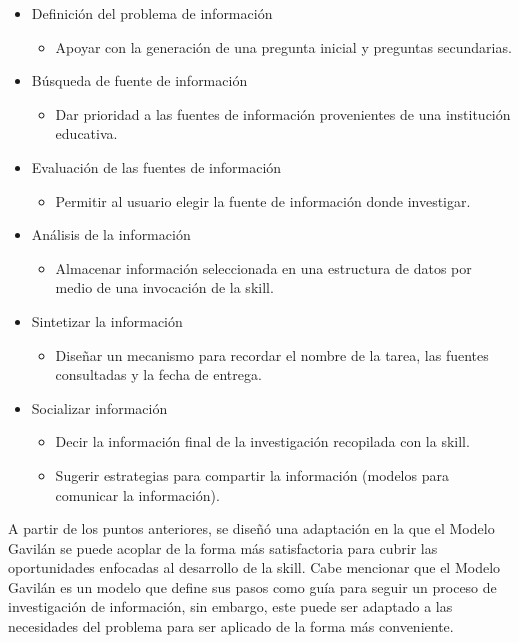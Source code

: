 \begin{itemize}
  \item Definición del problema de información
  \begin{itemize}
    \item Apoyar con la generación de una pregunta inicial y preguntas secundarias.
  \end{itemize}
  \item Búsqueda de fuente de información
  \begin{itemize}
    \item Dar prioridad a las fuentes de información provenientes de una institución educativa.
  \end{itemize}
  \item Evaluación de las fuentes de información
  \begin{itemize}
    \item Permitir al usuario elegir la fuente de información donde investigar.
  \end{itemize}
  \item Análisis de la información
  \begin{itemize}
    \item Almacenar información seleccionada en una estructura de datos por medio de una invocación de la skill.
  \end{itemize}
  \item Sintetizar la información
  \begin{itemize}
    \item Diseñar un mecanismo para recordar el nombre de la tarea, las fuentes consultadas y la fecha de entrega.
  \end{itemize}
  \item Socializar información
  \begin{itemize}
    \item Decir la información final de la investigación recopilada con la skill.
    \item Sugerir estrategias para compartir la información (modelos para comunicar la información).
  \end{itemize}
\end{itemize}

A partir de los puntos anteriores, se diseñó una adaptación en la que el Modelo Gavilán se puede acoplar de la forma más satisfactoria para cubrir las oportunidades enfocadas al desarrollo de la skill. Cabe mencionar que el Modelo Gavilán es un modelo que define sus pasos como guía para seguir un proceso de investigación de información, sin embargo, este puede ser adaptado a las necesidades del problema para ser aplicado de la forma más conveniente.

